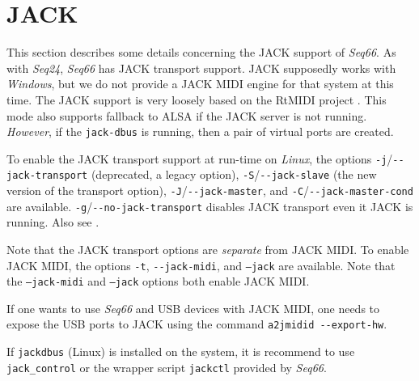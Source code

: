 %
%
%

\section{JACK}
\label{sec:jack}

   This section describes some details concerning the JACK support of
   \textsl{Seq66}.
   As with \textsl{Seq24}, \textsl{Seq66} has JACK transport support.
   JACK supposedly works with \textsl{Windows}, but we do not provide a JACK
   MIDI engine for that system at this time.
   The JACK support is very loosely based on the RtMIDI project
   \cite{rtmidi}.
   This mode also supports fallback to ALSA if the JACK server is not running.
   \textsl{However}, if the \texttt{jack-dbus} is running, then a pair of virtual
   ports are created.

   To enable the JACK transport support at run-time on
   \textsl{Linux}, the options
   \texttt{-j}/\texttt{-{}-jack-transport} (deprecated, a legacy option),
   \texttt{-S}/\texttt{-{}-jack-slave} (the new version of the transport
   option),
   \texttt{-J}/\texttt{-{}-jack-master},
   and \texttt{-C}/\texttt{-{}-jack-master-cond} are available.
   \texttt{-g}/\texttt{-{}-no-jack-transport}
   disables JACK transport even it JACK is running.
   Also see .

   Note that the JACK transport options are \textsl{separate} from JACK MIDI.
   To enable JACK MIDI, the options \texttt{-t}, \texttt{-{}-jack-midi},
   and \texttt{--jack} are available.
   Note that the \texttt{--jack-midi} and \texttt{--jack} options both
   enable JACK MIDI.

   If one wants to use \textsl{Seq66} and USB devices
   with JACK MIDI, one needs to expose the USB ports to JACK using the
   command \texttt{a2jmidid -{}-export-hw}.

   If \texttt{jackdbus} (Linux) is installed on the system, it is recommend
   to use \texttt{jack\_control} or the wrapper script \texttt{jackctl}
   provided by \textsl{Seq66}.

